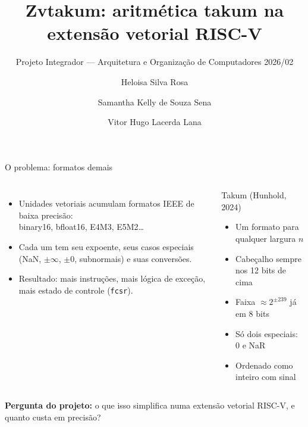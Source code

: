 \documentclass[aspectratio=169,10pt]{beamer}
\title{Zvtakum: aritmética takum na extensão vetorial RISC-V}
\subtitle{Projeto Integrador --- Arquitetura e Organização de Computadores 2026/02}
\author{Heloisa Silva Rosa \and Samantha Kelly de Souza Sena \and Vitor Hugo Lacerda Lana}
\institute{DELT --- UFMG}
\date{}
\newcommand{\code}[1]{\texttt{#1}}
\begin{document}
\begin{frame}
  \titlepage
\end{frame}

\begin{frame}{O problema: formatos demais}
  \begin{columns}[T]
    \begin{itemize}
      \item Unidades vetoriais acumulam formatos IEEE de baixa precisão:\\
            binary16, bfloat16, E4M3, E5M2\ldots
      \item Cada um tem seu expoente, seus casos especiais (NaN, $\pm\infty$, $\pm0$, subnormais) e suas
            conversões.
      \item Resultado: mais instruções, mais lógica de exceção, mais estado de controle (\code{fcsr}).
    \end{itemize}
    \begin{block}{Takum (Hunhold, 2024)}
      \begin{itemize}
        \item Um formato para qualquer largura $n$
        \item Cabeçalho sempre nos 12 bits de cima
        \item Faixa $\approx 2^{\pm239}$ já em 8 bits
        \item Só dois especiais: $0$ e NaR
        \item Ordenado como inteiro com sinal
      \end{itemize}
    \end{block}
  \end{columns}
  \vfill
  \textbf{Pergunta do projeto:} o que isso simplifica numa extensão vetorial RISC-V, e quanto custa em precisão?
\end{frame}
\end{document}
